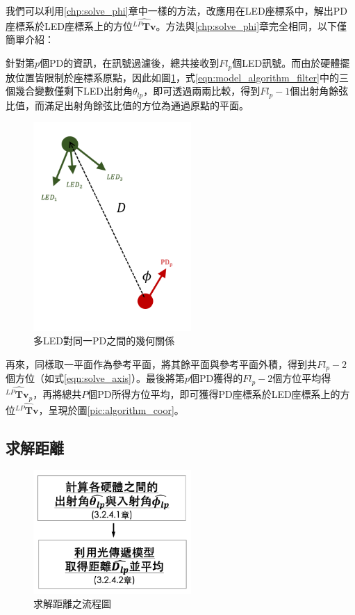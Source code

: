     我們可以利用\ref{chp:solve_phi}章中一樣的方法，改應用在LED座標系中，解出PD座標系於LED座標系上的方位$\hat{{^{LP}\boldsymbol{Tv}}}$。方法與\ref{chp:solve_phi}章完全相同，以下僅簡單介紹：

    針對第$p$個PD的資訊，在訊號過濾後，總共接收到$Fl_p$個LED訊號。而由於硬體擺放位置皆限制於座標系原點，因此如圖\ref{pic:mulled_1pd}，式\ref{eqn:model_algorithm_filter}中的三個幾合變數僅剩下LED出射角$\theta_{lp}$，即可透過兩兩比較，得到$Fl_p-1$個出射角餘弦比值，而滿足出射角餘弦比值的方位為通過原點的平面。
    
    \begin{figure}[htpb]
        \centering
        \includegraphics[width=6cm]{ch3pic/mulled_1pd.png}
        \caption{多LED對同一PD之間的幾何關係}
        \label{pic:mulled_1pd}
    \end{figure}

    再來，同樣取一平面作為參考平面，將其餘平面與參考平面外積，得到共$Fl_p-2$個方位（如式\ref{eqn:solve_axis}）。最後將第$p$個PD獲得的$Fl_p-2$個方位平均得$\hat{{^{LP}\boldsymbol{Tv}_{p}}}$，再將總共$P$個PD所得方位平均，即可獲得PD座標系於LED座標系上的方位$\hat{{^{LP}\boldsymbol{Tv}}}$，呈現於圖\ref{pic:algorithm_coor}。
         
    


    \subsection{求解距離}
    \label{chp:solve_D}

    \begin{figure}[htpb]
        \centering
        \includegraphics[width=6cm]{ch3pic/solve_dis_flow.png}
        \caption{求解距離之流程圖}
        \label{pic:solve_dis_flow}
    \end{figure}

